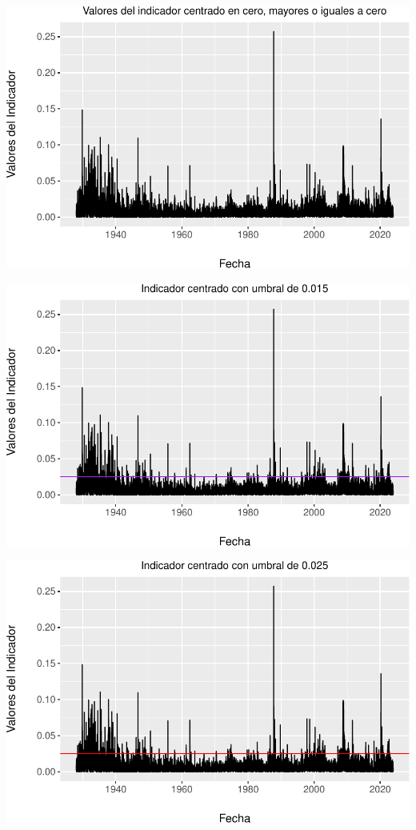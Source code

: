 \documentclass[
  oneside]{article}
\begin{document}
\includegraphics{Entrega_Laura_Montaldo_files/figure-latex/unnamed-chunk-17-1.pdf}

\includegraphics{Entrega_Laura_Montaldo_files/figure-latex/unnamed-chunk-18-1.pdf}

\includegraphics{Entrega_Laura_Montaldo_files/figure-latex/unnamed-chunk-19-1.pdf}
\end{document}
